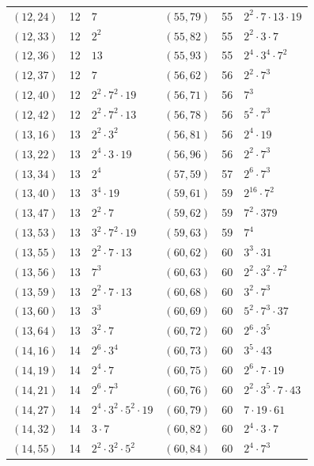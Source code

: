 \documentclass[11pt]{article}
\begin{document}
\begin{longtable}{@{}lrl@{\qquad}lrl@{}}
$(12,24)$ & 12 & $7$ & $(55,79)$ & 55 & $2^{2}\cdot 7\cdot 13\cdot 19$\\
$(12,33)$ & 12 & $2^{2}$ & $(55,82)$ & 55 & $2^{2}\cdot 3\cdot 7$\\
$(12,36)$ & 12 & $13$ & $(55,93)$ & 55 & $2^{4}\cdot 3^{4}\cdot 7^{2}$\\
$(12,37)$ & 12 & $7$ & $(56,62)$ & 56 & $2^{2}\cdot 7^{3}$\\
$(12,40)$ & 12 & $2^{2}\cdot 7^{2}\cdot 19$ & $(56,71)$ & 56 & $7^{3}$\\
$(12,42)$ & 12 & $2^{2}\cdot 7^{2}\cdot 13$ & $(56,78)$ & 56 & $5^{2}\cdot 7^{3}$\\
$(13,16)$ & 13 & $2^{2}\cdot 3^{2}$ & $(56,81)$ & 56 & $2^{4}\cdot 19$\\
$(13,22)$ & 13 & $2^{4}\cdot 3\cdot 19$ & $(56,96)$ & 56 & $2^{2}\cdot 7^{3}$\\
$(13,34)$ & 13 & $2^{4}$ & $(57,59)$ & 57 & $2^{6}\cdot 7^{3}$\\
$(13,40)$ & 13 & $3^{4}\cdot 19$ & $(59,61)$ & 59 & $2^{16}\cdot 7^{2}$\\
$(13,47)$ & 13 & $2^{2}\cdot 7$ & $(59,62)$ & 59 & $7^{2}\cdot 379$\\
$(13,53)$ & 13 & $3^{2}\cdot 7^{2}\cdot 19$ & $(59,63)$ & 59 & $7^{4}$\\
$(13,55)$ & 13 & $2^{2}\cdot 7\cdot 13$ & $(60,62)$ & 60 & $3^{3}\cdot 31$\\
$(13,56)$ & 13 & $7^{3}$ & $(60,63)$ & 60 & $2^{2}\cdot 3^{2}\cdot 7^{2}$\\
$(13,59)$ & 13 & $2^{2}\cdot 7\cdot 13$ & $(60,68)$ & 60 & $3^{2}\cdot 7^{3}$\\
$(13,60)$ & 13 & $3^{3}$ & $(60,69)$ & 60 & $5^{2}\cdot 7^{3}\cdot 37$\\
$(13,64)$ & 13 & $3^{2}\cdot 7$ & $(60,72)$ & 60 & $2^{6}\cdot 3^{5}$\\
$(14,16)$ & 14 & $2^{6}\cdot 3^{4}$ & $(60,73)$ & 60 & $3^{5}\cdot 43$\\
$(14,19)$ & 14 & $2^{4}\cdot 7$ & $(60,75)$ & 60 & $2^{6}\cdot 7\cdot 19$\\
$(14,21)$ & 14 & $2^{6}\cdot 7^{3}$ & $(60,76)$ & 60 & $2^{2}\cdot 3^{5}\cdot 7\cdot 43$\\
$(14,27)$ & 14 & $2^{4}\cdot 3^{2}\cdot 5^{2}\cdot 19$ & $(60,79)$ & 60 & $7\cdot 19\cdot 61$\\
$(14,32)$ & 14 & $3\cdot 7$ & $(60,82)$ & 60 & $2^{4}\cdot 3\cdot 7$\\
$(14,55)$ & 14 & $2^{2}\cdot 3^{2}\cdot 5^{2}$ & $(60,84)$ & 60 & $2^{4}\cdot 7^{3}$\\

\end{longtable}
\end{document}
